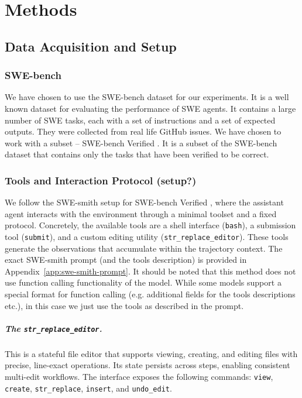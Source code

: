 \chapter{Methods}


\section{Data Acquisition and Setup}

\subsection{SWE-bench}
We have chosen to use the SWE-bench \cite{jimenez2024swebench} dataset for our experiments.
It is a well known dataset for evaluating the performance of SWE agents.
It contains a large number of SWE tasks, each with a set of instructions and a set of expected outputs.
They were collected from real life GitHub issues. 
We have chosen to work with a subset -- SWE-bench Verified \cite{swebench-verified}.
It is a subset of the SWE-bench dataset that contains only the tasks that have been verified to be correct.

\subsection{Tools and Interaction Protocol (setup?)}
We follow the SWE-smith setup for SWE-bench Verified \cite{jimenez2024swebench}, where the assistant agent interacts with the environment through a minimal toolset and a fixed protocol. 
Concretely, the available tools are a shell interface (\texttt{bash}), a submission tool (\texttt{submit}), and a custom editing utility (\texttt{str\_replace\_editor}).
These tools generate the observations that accumulate within the trajectory context.
The exact SWE-smith prompt (and the tools description) is provided in Appendix~\ref{app:swe-smith-prompt}.
It should be noted that this method does not use function calling functionality of the model. 
While some models support a special format for function calling (e.g. additional fields for the tools descriptions etc.), in this case we just use the tools as described in the prompt.

\paragraph{The \texttt{str\_replace\_editor}.}
This is a stateful file editor that supports viewing, creating, and editing files with precise, line-exact operations.
Its state persists across steps, enabling consistent multi-edit workflows. 
The interface exposes the following commands: \texttt{view}, \texttt{create}, \texttt{str\_replace}, \texttt{insert}, and \texttt{undo\_edit}. 

